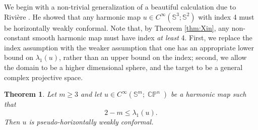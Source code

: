 \documentclass[11pt]{article}
\theoremstyle{plain}
\numberwithin{equation}{section}
\newtheorem{theorem}{Theorem}[section]
\theoremstyle{definition}
\def \mb{\mathbb}
\DeclareMathOperator{\CP}{\mathbb{CP}}
\begin{document}
We begin with a non-trivial generalization of a beautiful calculation due to Rivière \cite{Riviere2023}. 
He showed that any harmonic map $u\in C^\infty(\mb S^3;\mb S^2)$ with index 4 must be horizontally weakly conformal. Note that, by Theorem \ref{thm:Xin}, any non-constant smooth harmonic map must have index \textit{at least} 4. First, we replace the index assumption with the weaker assumption that one has an appropriate lower bound on $\lambda_1(u)$, rather than an upper bound on the index; second, we allow the domain to be a higher dimensional sphere, and the target to be a general complex projective space.

\begin{theorem}
    \label{thm:Riv}
    Let $m\geq 3$ and let $u \in C^\infty(\mb S^m;\CP^n)$ be a harmonic map such that $$2-m\leq \lambda_1(u).$$
    Then $u$ is pseudo-horizontally weakly conformal.
\end{theorem}
\end{document}
